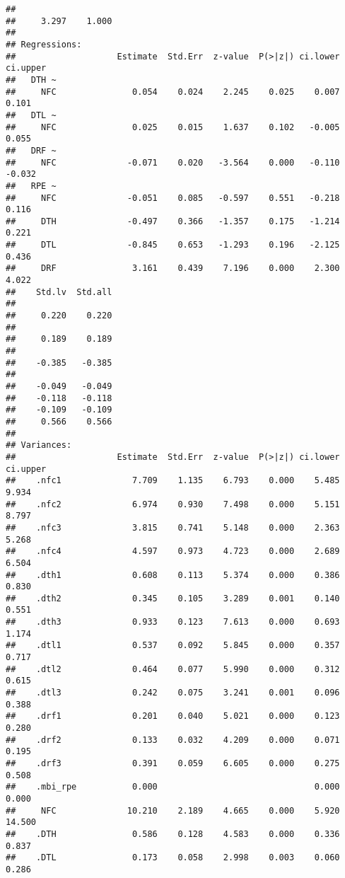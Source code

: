 \documentclass[
  english,
  man]{apa6}
\begin{document}
\begin{verbatim}
##                   
##     3.297    1.000
## 
## Regressions:
##                    Estimate  Std.Err  z-value  P(>|z|) ci.lower ci.upper
##   DTH ~                                                                 
##     NFC               0.054    0.024    2.245    0.025    0.007    0.101
##   DTL ~                                                                 
##     NFC               0.025    0.015    1.637    0.102   -0.005    0.055
##   DRF ~                                                                 
##     NFC              -0.071    0.020   -3.564    0.000   -0.110   -0.032
##   RPE ~                                                                 
##     NFC              -0.051    0.085   -0.597    0.551   -0.218    0.116
##     DTH              -0.497    0.366   -1.357    0.175   -1.214    0.221
##     DTL              -0.845    0.653   -1.293    0.196   -2.125    0.436
##     DRF               3.161    0.439    7.196    0.000    2.300    4.022
##    Std.lv  Std.all
##                   
##     0.220    0.220
##                   
##     0.189    0.189
##                   
##    -0.385   -0.385
##                   
##    -0.049   -0.049
##    -0.118   -0.118
##    -0.109   -0.109
##     0.566    0.566
## 
## Variances:
##                    Estimate  Std.Err  z-value  P(>|z|) ci.lower ci.upper
##    .nfc1              7.709    1.135    6.793    0.000    5.485    9.934
##    .nfc2              6.974    0.930    7.498    0.000    5.151    8.797
##    .nfc3              3.815    0.741    5.148    0.000    2.363    5.268
##    .nfc4              4.597    0.973    4.723    0.000    2.689    6.504
##    .dth1              0.608    0.113    5.374    0.000    0.386    0.830
##    .dth2              0.345    0.105    3.289    0.001    0.140    0.551
##    .dth3              0.933    0.123    7.613    0.000    0.693    1.174
##    .dtl1              0.537    0.092    5.845    0.000    0.357    0.717
##    .dtl2              0.464    0.077    5.990    0.000    0.312    0.615
##    .dtl3              0.242    0.075    3.241    0.001    0.096    0.388
##    .drf1              0.201    0.040    5.021    0.000    0.123    0.280
##    .drf2              0.133    0.032    4.209    0.000    0.071    0.195
##    .drf3              0.391    0.059    6.605    0.000    0.275    0.508
##    .mbi_rpe           0.000                               0.000    0.000
##     NFC              10.210    2.189    4.665    0.000    5.920   14.500
##    .DTH               0.586    0.128    4.583    0.000    0.336    0.837
##    .DTL               0.173    0.058    2.998    0.003    0.060    0.286

\end{verbatim}
\end{document}
